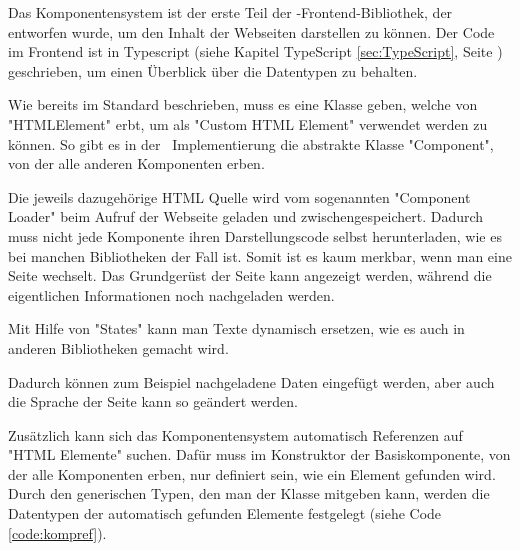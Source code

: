 \label{sec:webcompimp}



Das Komponentensystem ist der erste Teil der \ZELIA-Frontend-Bibliothek, der entworfen wurde, um den Inhalt der Webseiten darstellen zu können. Der Code im Frontend ist in Typescript (siehe Kapitel TypeScript \ref{sec:TypeScript}, Seite \pageref{sec:TypeScript}) geschrieben, um einen Überblick über die Datentypen zu behalten.


Wie bereits im Standard beschrieben, muss es eine Klasse geben, welche von "HTMLElement" erbt, um als "Custom HTML Element" verwendet werden zu können. So gibt es in der \ZELIA\ Implementierung die abstrakte Klasse "Component", von der alle anderen Komponenten erben.


Die jeweils dazugehörige HTML Quelle wird vom sogenannten "Component Loader" beim Aufruf der Webseite geladen und zwischengespeichert. Dadurch muss nicht jede Komponente ihren Darstellungscode selbst herunterladen, wie es bei manchen Bibliotheken der Fall ist. Somit ist es kaum merkbar, wenn man eine Seite wechselt. Das Grundgerüst der Seite kann angezeigt werden, während die eigentlichen Informationen noch nachgeladen werden. 

Mit Hilfe von "States" kann man Texte dynamisch ersetzen, wie es auch in anderen Bibliotheken gemacht wird.



Dadurch können zum Beispiel nachgeladene Daten eingefügt werden, aber auch die Sprache der Seite kann so geändert werden.

Zusätzlich kann sich das Komponentensystem automatisch Referenzen auf "HTML Elemente" suchen. Dafür muss im Konstruktor der Basiskomponente, von der alle Komponenten erben, nur definiert sein, wie ein Element gefunden wird. Durch den generischen Typen, den man der Klasse mitgeben kann, werden die Datentypen der automatisch gefunden Elemente festgelegt (siehe Code \ref{code:kompref}).


